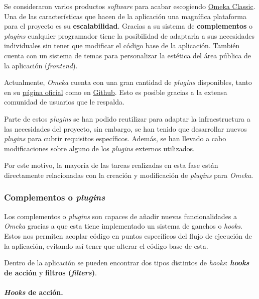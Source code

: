 Se consideraron varios productos \emph{software} para acabar escogiendo
\href{https://omeka.org/classic/}{Omeka Classic}. Una de las
características que hacen de la aplicación una magnífica plataforma para
el proyecto es su \textbf{escalabilidad}. Gracias a su sistema de
\textbf{complementos} o \emph{plugins} cualquier programador tiene la
posibilidad de adaptarla a sus necesidades individuales sin tener que
modificar el código base de la aplicación. También cuenta con un sistema de
temas para personalizar la estética del área pública de la aplicación (\emph{frontend}).


Actualmente, \emph{Omeka} cuenta con una gran cantidad de \emph{plugins}
disponibles, tanto en su \href{https://omeka.org/classic/plugins/}{página
oficial} como en \href{https://daniel-km.github.io/UpgradeToOmekaS/omeka_plugins.html}{Github}.
Esto es posible gracias a la extensa comunidad de usuarios que le
respalda. 

Parte de estos \emph{plugins} se han podido reutilizar para
adaptar la infraestructura a las necesidades del proyecto, sin embargo,
se han tenido que desarrollar nuevos \emph{plugins} para cubrir
requisitos específicos. Además, se han llevado a cabo modificaciones
sobre alguno de los \emph{plugins} externos utilizados.

Por este motivo, la mayoría de las tareas realizadas en esta fase están directamente
relacionadas con la creación y modificación de \emph{plugins} para \emph{Omeka}.

\subsubsection{Complementos o \emph{plugins}}

Los complementos o \emph{plugins} son capaces de añadir nuevas
funcionalidades a \emph{Omeka} gracias a que esta tiene implementado un
sistema de ganchos o \emph{hooks}. Estos nos permiten acoplar código en
puntos específicos del flujo de ejecución de la aplicación, evitando así
tener que alterar el código base de esta.

Dentro de la aplicación se pueden encontrar dos tipos distintos de
\emph{hooks}: \textbf{\emph{hooks} de acción} y \textbf{filtros (\emph{filters})}.

\paragraph{\emph{Hooks} de acción.}

